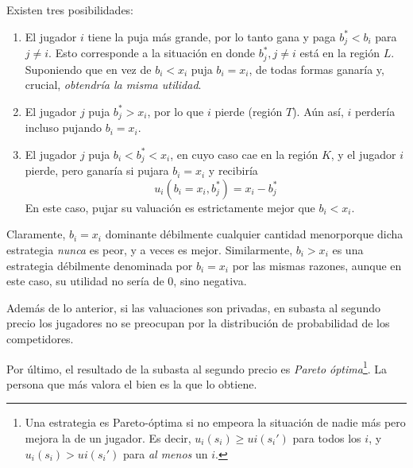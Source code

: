 \documentclass[12pt]{article}
\begin{document}
Existen tres posibilidades:

\begin{enumerate}
	\setlength{\itemsep}{0pt}
	\setlength{\parskip}{0pt}
	\setlength{\parsep}{0pt}
	\item El jugador $ i $ tiene la puja más grande, por lo tanto gana y paga $ b_j^* < b_i $ para $ j \neq i $. Esto corresponde a la situación en donde $ b_j^*, j\neq i $ está en la región $ L $. Suponiendo que en vez de $ b_i < x_i $ puja $ b_i = x_i $, de todas formas ganaría y, crucial, \textit{obtendría la misma utilidad}.
	\item El jugador $ j $ puja $ b_j^* > x_i $, por lo que $ i $ pierde (región $ T $). Aún así, $ i $ perdería incluso pujando $ b_i = x_i $.
	\item El jugador $ j $ puja $ b_i < b_j ^* <x_i $, en cuyo caso cae en la región $ K $, y el jugador $ i $ pierde, pero ganaría si pujara $ b_i = x_i $ y recibiría \[ u_i(b_i=x_i, b_j^*)=x_i - b_j^*\]
	      En este caso, pujar su valuación es estrictamente mejor que $ b_i < x_i $.
\end{enumerate}

Claramente, $ b_i = x_i $ dominante débilmente cualquier cantidad menorporque dicha estrategia \textit{nunca} es peor, y a veces es mejor. Similarmente, $ b_i > x_i $ es una estrategia débilmente denominada por $ b_i=x_i $ por las mismas razones, aunque en este caso, su utilidad no sería de 0, sino negativa.

Además de lo anterior, si las valuaciones son privadas, en subasta al segundo precio los jugadores no se preocupan por la distribución de probabilidad de los competidores.

Por último, el resultado de la subasta al segundo precio es \textit{Pareto óptima}\footnote{
	Una estrategia es Pareto-óptima si no empeora la situación de nadie más pero mejora la de un jugador. Es decir, $ u_i(s_i) \geq ui(s_i') $ para todos los $ i $, y $ u_i(s_i) > ui(s_i') $ para \textit{al menos} un $ i $.
}. La persona que más valora el bien es la que lo obtiene.




\end{document}
